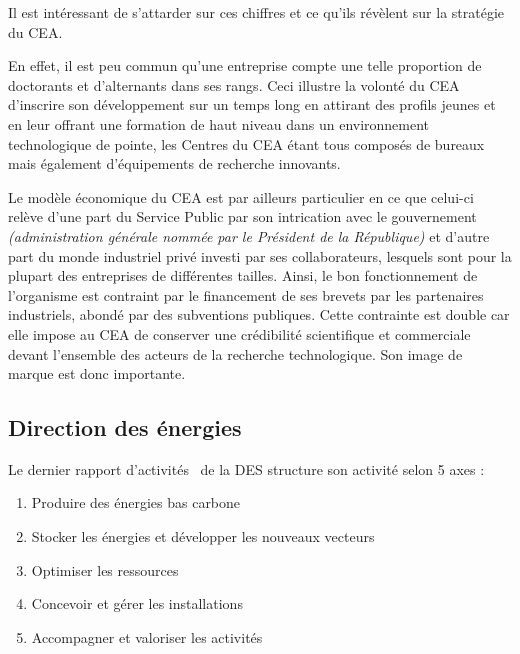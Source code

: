     \begin{tcolorbox}[colback=linkborderColor!5!white,colframe=linkborderColor!75!black]
        Il est intéressant de s'attarder sur ces chiffres et ce qu'ils révèlent sur la stratégie du \gls{CEA}.

        En effet, il est peu commun qu'une entreprise compte une telle proportion de doctorants et d'alternants dans ses rangs.
        Ceci illustre la volonté du \gls{CEA} d'inscrire son développement sur un temps long en attirant des profils jeunes et en leur offrant une formation de haut niveau dans un environnement technologique de pointe, les Centres du \gls{CEA} étant tous composés de bureaux mais également d'équipements de recherche innovants.

        Le modèle économique du \gls{CEA} est par ailleurs particulier en ce que celui-ci relève d'une part du Service Public par son intrication avec le gouvernement \textit{(administration générale nommée par le Président de la République)} et d'autre part du monde industriel privé investi par ses collaborateurs, lesquels sont pour la plupart des entreprises de différentes tailles.
        Ainsi, le bon fonctionnement de l'organisme est contraint par le financement de ses brevets par les partenaires industriels, abondé par des subventions publiques.
        Cette contrainte est double car elle impose au \gls{CEA} de conserver une crédibilité scientifique et commerciale devant l'ensemble des acteurs de la recherche technologique.
        Son image de marque est donc importante.
    \end{tcolorbox}

    \newpage\subsection{Direction des énergies}\label{subsec:direction-des-energies}

Le dernier rapport d'activités~\cite{CEA_prez_DES} de la \gls{DES} structure son activité selon 5 axes :
        \begin{enumerate}
            \item Produire des énergies bas carbone
            \item Stocker les énergies et développer les nouveaux vecteurs
            \item Optimiser les ressources
            \item Concevoir et gérer les installations
            \item Accompagner et valoriser les activités
        \end{enumerate}

